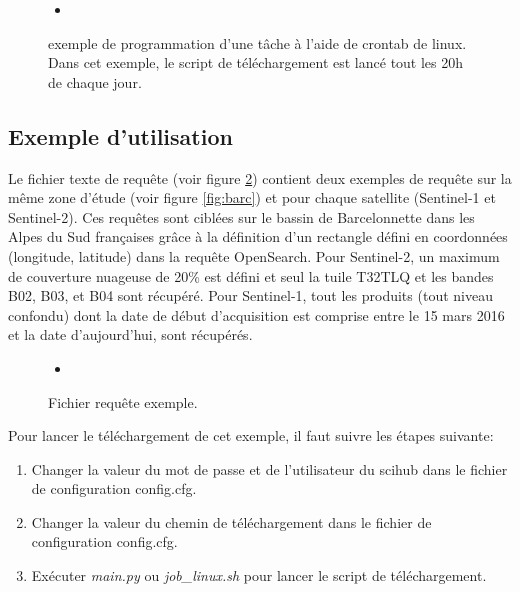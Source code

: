 \documentclass[notitlepage]{report}
\newcommand{\insertcode}[2]{\begin{itemize}\item[]\end{itemize}} %
\begin{document}
\begin{figure}
\insertcode{"exemple/crontab"}{}
\caption{exemple de programmation d'une tâche à l'aide de crontab de linux. Dans cet exemple, le script de téléchargement est lancé tout les 20h de chaque jour.}
\label{fig:cron}
\end{figure}


\subsection{Exemple d'utilisation}
Le fichier texte de requête (voir figure \ref{fig:reqconc}) contient deux exemples de requête sur la même zone d'étude (voir figure \ref{fig:barc}) et pour chaque satellite (Sentinel-1 et Sentinel-2). Ces requêtes sont ciblées sur le bassin de Barcelonnette dans les Alpes du Sud françaises grâce à la définition d'un rectangle défini en coordonnées (longitude, latitude) dans la requête OpenSearch. Pour Sentinel-2, un maximum de couverture nuageuse de 20\% est défini et seul la tuile T32TLQ et les bandes B02, B03, et B04 sont récupéré. Pour Sentinel-1, tout les produits (tout niveau confondu) dont la date de début d'acquisition est comprise entre le 15 mars 2016 et la date d'aujourd'hui, sont récupérés.

\begin{figure}
\insertcode{"exemple/requete.csv"}{}
\caption{Fichier requête exemple.}
\label{fig:reqconc}
\end{figure}

Pour lancer le téléchargement de cet exemple, il faut suivre les étapes suivante:
\begin{enumerate}
\item Changer la valeur du mot de passe et de l'utilisateur du scihub dans le fichier de configuration config.cfg.
\item Changer la valeur du chemin de téléchargement dans le fichier de configuration config.cfg.
\item Exécuter \emph{main.py} ou \emph{job\_linux.sh} pour lancer le script de téléchargement.
\end{enumerate}
\end{document}
